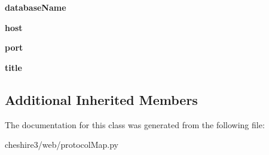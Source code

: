 \begin{DoxyCompactItemize}
\item 
\hypertarget{classcheshire3_1_1web_1_1protocol_map_1_1_o_a_i_p_m_h_protocol_map_a5db38911c8eb975314d2d05aa834048f}{{\bfseries database\-Name}}\label{classcheshire3_1_1web_1_1protocol_map_1_1_o_a_i_p_m_h_protocol_map_a5db38911c8eb975314d2d05aa834048f}

\item 
\hypertarget{classcheshire3_1_1web_1_1protocol_map_1_1_o_a_i_p_m_h_protocol_map_a5b697f4f58740dbd2217cbf8afe6f792}{{\bfseries host}}\label{classcheshire3_1_1web_1_1protocol_map_1_1_o_a_i_p_m_h_protocol_map_a5b697f4f58740dbd2217cbf8afe6f792}

\item 
\hypertarget{classcheshire3_1_1web_1_1protocol_map_1_1_o_a_i_p_m_h_protocol_map_ab1c11aacbf6bb4446a37df86de5be58a}{{\bfseries port}}\label{classcheshire3_1_1web_1_1protocol_map_1_1_o_a_i_p_m_h_protocol_map_ab1c11aacbf6bb4446a37df86de5be58a}

\item 
\hypertarget{classcheshire3_1_1web_1_1protocol_map_1_1_o_a_i_p_m_h_protocol_map_a28afaa6a466b994ad97c6ada79a0a428}{{\bfseries title}}\label{classcheshire3_1_1web_1_1protocol_map_1_1_o_a_i_p_m_h_protocol_map_a28afaa6a466b994ad97c6ada79a0a428}

\end{DoxyCompactItemize}
\subsection*{Additional Inherited Members}


The documentation for this class was generated from the following file\-:\begin{DoxyCompactItemize}
\item 
cheshire3/web/protocol\-Map.\-py\end{DoxyCompactItemize}
